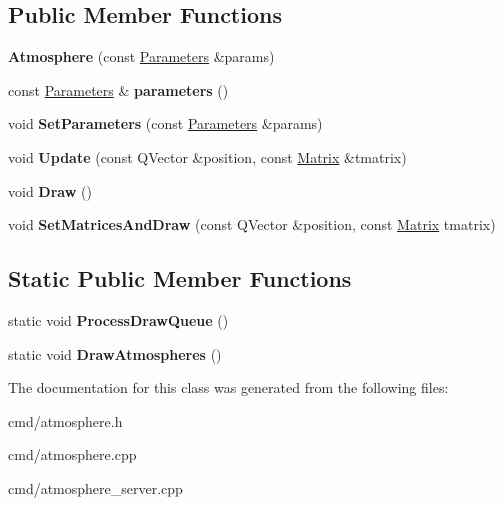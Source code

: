 \subsection*{Public Member Functions}
\begin{DoxyCompactItemize}
\item 
{\bfseries Atmosphere} (const \hyperlink{structAtmosphere_1_1Parameters}{Parameters} \&params)\hypertarget{classAtmosphere_a0dfeb46a7c15c06a1bb6743f96102ec7}{}\label{classAtmosphere_a0dfeb46a7c15c06a1bb6743f96102ec7}

\item 
const \hyperlink{structAtmosphere_1_1Parameters}{Parameters} \& {\bfseries parameters} ()\hypertarget{classAtmosphere_aec7b5de8088642537a49909491c07ad4}{}\label{classAtmosphere_aec7b5de8088642537a49909491c07ad4}

\item 
void {\bfseries Set\+Parameters} (const \hyperlink{structAtmosphere_1_1Parameters}{Parameters} \&params)\hypertarget{classAtmosphere_a4a11390c6ef2f218636a5a29a49bf767}{}\label{classAtmosphere_a4a11390c6ef2f218636a5a29a49bf767}

\item 
void {\bfseries Update} (const Q\+Vector \&position, const \hyperlink{classMatrix}{Matrix} \&tmatrix)\hypertarget{classAtmosphere_a94d30409c22d1484ce3a80962f1b4d33}{}\label{classAtmosphere_a94d30409c22d1484ce3a80962f1b4d33}

\item 
void {\bfseries Draw} ()\hypertarget{classAtmosphere_a821187f632aef41b46b1ae2aba23724e}{}\label{classAtmosphere_a821187f632aef41b46b1ae2aba23724e}

\item 
void {\bfseries Set\+Matrices\+And\+Draw} (const Q\+Vector \&position, const \hyperlink{classMatrix}{Matrix} tmatrix)\hypertarget{classAtmosphere_a0901fd393723a1d348cb6e9bb353e46e}{}\label{classAtmosphere_a0901fd393723a1d348cb6e9bb353e46e}

\end{DoxyCompactItemize}
\subsection*{Static Public Member Functions}
\begin{DoxyCompactItemize}
\item 
static void {\bfseries Process\+Draw\+Queue} ()\hypertarget{classAtmosphere_aef0bf3a4f199a09a3ccff227d5e24c8f}{}\label{classAtmosphere_aef0bf3a4f199a09a3ccff227d5e24c8f}

\item 
static void {\bfseries Draw\+Atmospheres} ()\hypertarget{classAtmosphere_aaca0fe2fc554dedfea0a2aec8a76ed0f}{}\label{classAtmosphere_aaca0fe2fc554dedfea0a2aec8a76ed0f}

\end{DoxyCompactItemize}


The documentation for this class was generated from the following files\+:\begin{DoxyCompactItemize}
\item 
cmd/atmosphere.\+h\item 
cmd/atmosphere.\+cpp\item 
cmd/atmosphere\+\_\+server.\+cpp\end{DoxyCompactItemize}
